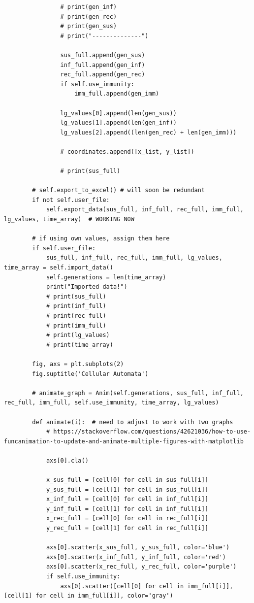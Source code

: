 \documentclass[11pt, a4paper]{article}
\begin{document}
\begin{lstlisting}
                # print(gen_inf)
                # print(gen_rec)
                # print(gen_sus)
                # print("--------------")

                sus_full.append(gen_sus)
                inf_full.append(gen_inf)
                rec_full.append(gen_rec)
                if self.use_immunity:
                    imm_full.append(gen_imm)

                lg_values[0].append(len(gen_sus))
                lg_values[1].append(len(gen_inf))
                lg_values[2].append((len(gen_rec) + len(gen_imm)))

                # coordinates.append([x_list, y_list])

                # print(sus_full)

        # self.export_to_excel() # will soon be redundant
        if not self.user_file:
            self.export_data(sus_full, inf_full, rec_full, imm_full, lg_values, time_array)  # WORKING NOW

        # if using own values, assign them here
        if self.user_file:
            sus_full, inf_full, rec_full, imm_full, lg_values, time_array = self.import_data()
            self.generations = len(time_array)
            print("Imported data!")
            # print(sus_full)
            # print(inf_full)
            # print(rec_full)
            # print(imm_full)
            # print(lg_values)
            # print(time_array)

        fig, axs = plt.subplots(2)
        fig.suptitle('Cellular Automata')

        # animate_graph = Anim(self.generations, sus_full, inf_full, rec_full, imm_full, self.use_immunity, time_array, lg_values)

        def animate(i):  # need to adjust to work with two graphs
            # https://stackoverflow.com/questions/42621036/how-to-use-funcanimation-to-update-and-animate-multiple-figures-with-matplotlib

            axs[0].cla()

            x_sus_full = [cell[0] for cell in sus_full[i]]
            y_sus_full = [cell[1] for cell in sus_full[i]]
            x_inf_full = [cell[0] for cell in inf_full[i]]
            y_inf_full = [cell[1] for cell in inf_full[i]]
            x_rec_full = [cell[0] for cell in rec_full[i]]
            y_rec_full = [cell[1] for cell in rec_full[i]]

            axs[0].scatter(x_sus_full, y_sus_full, color='blue')
            axs[0].scatter(x_inf_full, y_inf_full, color='red')
            axs[0].scatter(x_rec_full, y_rec_full, color='purple')
            if self.use_immunity:
                axs[0].scatter([cell[0] for cell in imm_full[i]], [cell[1] for cell in imm_full[i]], color='gray')


\end{lstlisting}
\end{document}
